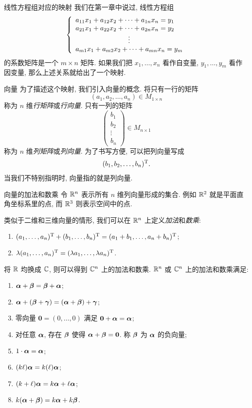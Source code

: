 \begin{frame}{线性方程组对应的映射}
	\onslide<+->
	我们在第一章中说过, 线性方程组
	\[\laeq{
		a_{11}x_1+a_{12}x_2+\cdots+a_{1n}x_n=y_1\\
		a_{21}x_1+a_{22}x_2+\cdots+a_{2n}x_n=y_2\\
		\vvdots\\
		a_{m1}x_1+a_{m2}x_2+\cdots+a_{mn}x_n=y_m
	}\]
	的系数矩阵是一个 $m\times n$ 矩阵.
	\onslide<+->
	如果我们把 $x_1,\dots,x_n$ 看作自变量, $y_1,\dots,y_m$ 看作因变量, 那么上述关系就给出了一个映射.
\end{frame}


\begin{frame}{向量}
	\onslide<+->
	为了描述这个映射, 我们引入向量的概念.
	\onslide<+->
	将只有一行的矩阵
	\[(a_1,a_2,\dots,a_n)\in M_{1\times n}\]
	称为 $n$ 维\emph{行矩阵}或\emph{行向量}.
	\onslide<+->
	只有一列的矩阵
	\[\begin{pmatrix}
		b_1\\b_2\\\vdots\\b_n
	\end{pmatrix}\in M_{n\times 1}\]
	称为 $n$ 维\emph{列矩阵}或\emph{列向量}.
	\onslide<+->
	为了书写方便, 可以把列向量写成
	\[(b_1,b_2,\dots,b_n)^{\mathrm{T}}.\]
	\onslide<+->
	\alert{当我们不特别指明时, 向量指的就是列向量.}
\end{frame}


\begin{frame}{向量的加法和数乘}
	\onslide<+->
	令 ${\mathbb{R}}^n$ 表示所有 $n$ 维列向量形成的集合.
	\onslide<+->
	例如 ${\mathbb{R}}^2$ 就是平面直角坐标系里的点, 而 ${\mathbb{R}}^3$ 则表示空间中的点.

	\onslide<+->
	类似于二维和三维向量的情形, 我们可以在 ${\mathbb{R}}^n$ 上定义\emph{加法}和\emph{数乘}:
	\begin{enumerate}
		\item $(a_1,\dots,a_n)^{\mathrm{T}}+(b_1,\dots,b_n)^{\mathrm{T}}=(a_1+b_1,\dots,a_n+b_n)^{\mathrm{T}}$;
		\item $\lambda(a_1,\dots,a_n)^{\mathrm{T}}=(\lambda a_1,\dots,\lambda a_n)^{\mathrm{T}}$.
	\end{enumerate}

	\onslide<+->
	将 ${\mathbb{R}}$ 均换成 ${\mathbb{C}}$, 则可以得到 ${\mathbb{C}}^n$ 上的加法和数乘.
	\onslide<+->
	${\mathbb{R}}^n$ 或 ${\mathbb{C}}^n$ 上的加法和数乘满足:
	\begin{enumerate}
		\item ${\boldsymbol{\alpha}}+{\boldsymbol{\beta}}={\boldsymbol{\beta}}+{\boldsymbol{\alpha}}$;
		\item ${\boldsymbol{\alpha}}+({\boldsymbol{\beta}}+{\boldsymbol{\gamma}})=({\boldsymbol{\alpha}}+{\boldsymbol{\beta}})+{\boldsymbol{\gamma}}$;
		\item 零向量 ${\bm0}=(0,\dots,0)$ 满足 ${\bm0}+{\boldsymbol{\alpha}}={\boldsymbol{\alpha}}$;
		\item 对任意 ${\boldsymbol{\alpha}}$, 存在 ${\boldsymbol{\beta}}$ 使得 ${\boldsymbol{\alpha}}+{\boldsymbol{\beta}}={\bf0}$. 称 ${\boldsymbol{\beta}}$ 为 ${\boldsymbol{\alpha}}$ 的负向量;
		\item $1\cdot{\boldsymbol{\alpha}}={\boldsymbol{\alpha}}$;
		\item $(k\ell){\boldsymbol{\alpha}}=k(\ell){\boldsymbol{\alpha}}$;
		\item $(k+\ell){\boldsymbol{\alpha}}=k{\boldsymbol{\alpha}}+\ell{\boldsymbol{\alpha}}$;
		\item $k({\boldsymbol{\alpha}}+{\boldsymbol{\beta}})=k{\boldsymbol{\alpha}}+k{\boldsymbol{\beta}}$.
	\end{enumerate}
\end{frame}


